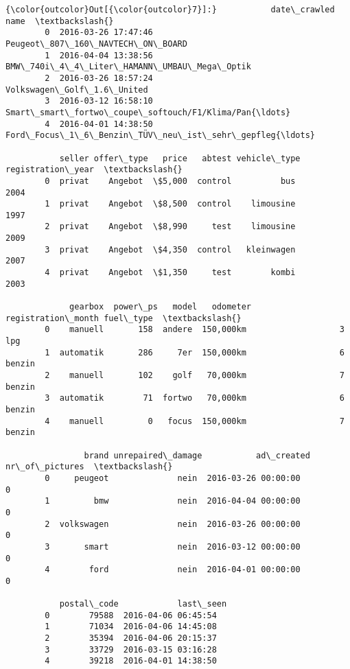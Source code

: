 \documentclass[11pt]{article}
\begin{document}
\begin{Verbatim}[commandchars=\\\{\}]
{\color{outcolor}Out[{\color{outcolor}7}]:}           date\_crawled                                               name  \textbackslash{}
        0  2016-03-26 17:47:46                   Peugeot\_807\_160\_NAVTECH\_ON\_BOARD   
        1  2016-04-04 13:38:56         BMW\_740i\_4\_4\_Liter\_HAMANN\_UMBAU\_Mega\_Optik   
        2  2016-03-26 18:57:24                         Volkswagen\_Golf\_1.6\_United   
        3  2016-03-12 16:58:10  Smart\_smart\_fortwo\_coupe\_softouch/F1/Klima/Pan{\ldots}   
        4  2016-04-01 14:38:50  Ford\_Focus\_1\_6\_Benzin\_TÜV\_neu\_ist\_sehr\_gepfleg{\ldots}   
        
           seller offer\_type   price   abtest vehicle\_type  registration\_year  \textbackslash{}
        0  privat    Angebot  \$5,000  control          bus               2004   
        1  privat    Angebot  \$8,500  control    limousine               1997   
        2  privat    Angebot  \$8,990     test    limousine               2009   
        3  privat    Angebot  \$4,350  control   kleinwagen               2007   
        4  privat    Angebot  \$1,350     test        kombi               2003   
        
             gearbox  power\_ps   model   odometer  registration\_month fuel\_type  \textbackslash{}
        0    manuell       158  andere  150,000km                   3       lpg   
        1  automatik       286     7er  150,000km                   6    benzin   
        2    manuell       102    golf   70,000km                   7    benzin   
        3  automatik        71  fortwo   70,000km                   6    benzin   
        4    manuell         0   focus  150,000km                   7    benzin   
        
                brand unrepaired\_damage           ad\_created  nr\_of\_pictures  \textbackslash{}
        0     peugeot              nein  2016-03-26 00:00:00               0   
        1         bmw              nein  2016-04-04 00:00:00               0   
        2  volkswagen              nein  2016-03-26 00:00:00               0   
        3       smart              nein  2016-03-12 00:00:00               0   
        4        ford              nein  2016-04-01 00:00:00               0   
        
           postal\_code            last\_seen  
        0        79588  2016-04-06 06:45:54  
        1        71034  2016-04-06 14:45:08  
        2        35394  2016-04-06 20:15:37  
        3        33729  2016-03-15 03:16:28  
        4        39218  2016-04-01 14:38:50  
\end{Verbatim}
            
\end{document}
